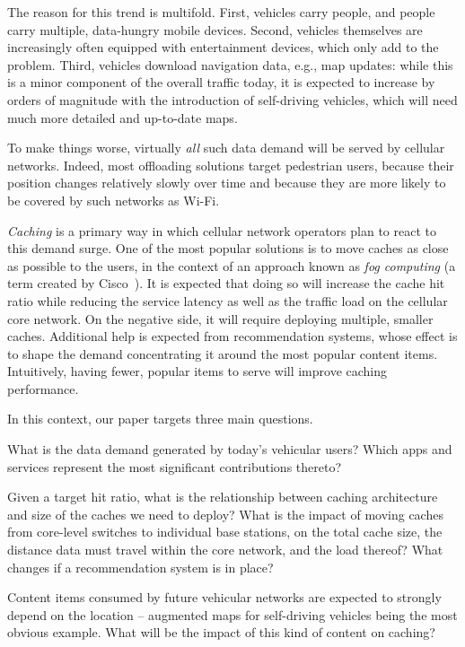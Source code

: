 \documentclass{sig-alternate-05-2015}
\begin{document}
The reason for this trend is multifold. First, vehicles carry people, and people carry multiple, data-hungry mobile devices. Second, vehicles themselves are increasingly often equipped with entertainment devices, which only add to the problem. Third, vehicles download navigation data, e.g., map updates: while this is a minor component of the overall traffic today, it is expected to increase by orders of magnitude with the introduction of self-driving vehicles, which will need much more detailed and up-to-date maps.

To make things worse, virtually {\em all} such data demand will be served by cellular networks. Indeed, most offloading solutions target pedestrian users, because their position changes relatively slowly over time and because they are more likely to be covered by such networks as Wi-Fi.

{\em Caching} is a primary way in which cellular network operators
plan to react to this demand surge. One of the most popular solutions
is to move caches as close as possible to the users, in the context of
an approach known as {\em fog computing} (a term created by
Cisco~\cite{fog}). It is expected that doing so will increase the
cache hit ratio while reducing the service latency as well as the
traffic load on the cellular core network. On the negative side, it will require deploying multiple, smaller caches. Additional help is expected from recommendation systems, whose effect is to shape the demand concentrating it around the most popular content items. Intuitively, having fewer, popular items to serve will improve caching performance.

In this context, our paper targets three main questions.

 What is the data demand generated by today's vehicular users? Which apps and services represent the most significant contributions thereto?

 Given a target hit ratio, what
is the relationship between  caching architecture and  size of the
caches we need to deploy? What is the impact of moving  caches from
core-level switches to individual base stations, on the total cache size,
the distance data must travel within the core network, and the load thereof?
What changes if a recommendation system is in place?

 Content items consumed by
future vehicular networks are expected to strongly depend on the
location -- augmented maps for self-driving vehicles being the most
obvious example. What will be the impact of this kind of content on caching?
\end{document}
